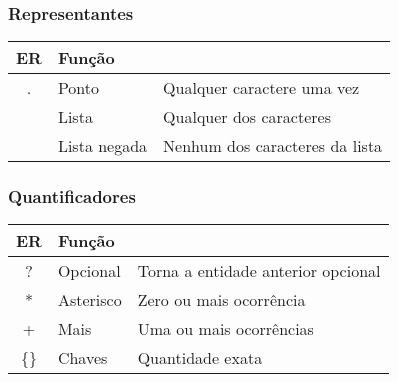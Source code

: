 \documentclass{beamer}
\begin{document}
   \begin{frame}
      \frametitle{Representantes}
      \begin{table}
         \begin{tabular}{ c | l | l}
         \textbf{ER} & \textbf{Função}  \\
         \hline 
         . & Ponto & Qualquer caractere uma vez \\
         \hline
         [] & Lista & Qualquer dos caracteres  \\
         \hline
         [\^{}] & Lista negada & Nenhum dos caracteres da lista  \\
         \hline
         \end{tabular}
      \end{table}
   \end{frame}

  \begin{frame}
      \frametitle{Quantificadores}
      \begin{table}
         \begin{tabular}{ c | l | l}
         \textbf{ER} & \textbf{Função}  \\
         \hline 
         ? & Opcional & Torna a entidade anterior opcional \\
         \hline
         * & Asterisco & Zero ou mais ocorrência  \\
         \hline
         + & Mais & Uma ou mais ocorrências  \\
         \hline
         \{\} & Chaves & Quantidade exata  \\
         \hline
         \end{tabular}
      \end{table}
   \end{frame}
\end{document}
